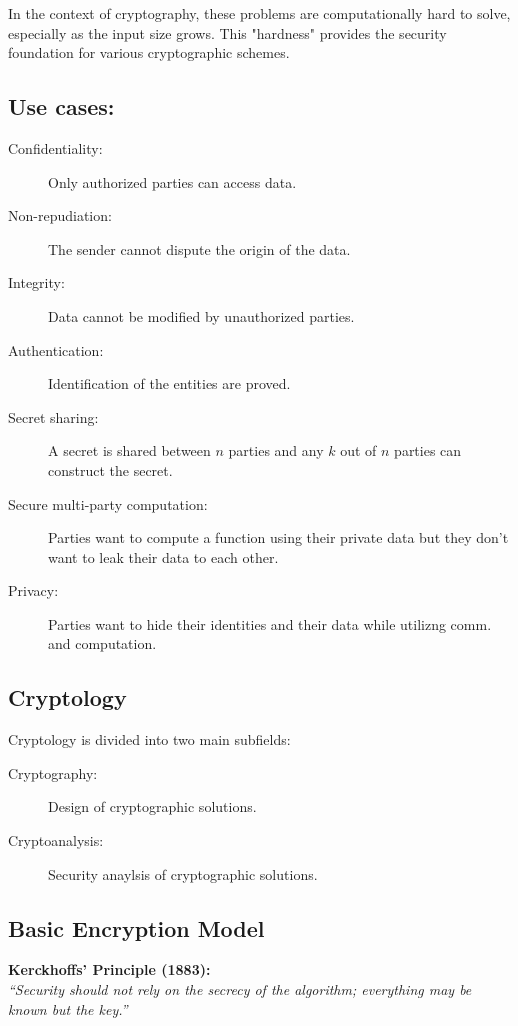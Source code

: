 \documentclass[12pt]{article}
\begin{document}
In the context of cryptography, these problems are computationally hard to solve, especially as the input size grows. This "hardness" provides the security foundation for various cryptographic schemes.

\subsection*{Use cases:}
\begin{description}
    \item[Confidentiality:] Only authorized parties can access data.
    \item[Non-repudiation:] The sender cannot dispute the origin of the data.
    \item[Integrity:] Data cannot be modified by unauthorized parties.
    \item[Authentication:] Identification of the entities are proved.
    \item[Secret sharing:] A secret is shared between \(n\) parties and any \(k\) out of \(n\) parties can construct the secret.
    \item[Secure multi-party computation:] Parties want to compute a function using their private data but they don't want to leak their data to each other.
    \item[Privacy:] Parties want to hide their identities and their data while utilizng comm. and computation. 
\end{description}

\subsection*{Cryptology}
Cryptology is divided into two main subfields:
\begin{description}
    \item[Cryptography:] Design of cryptographic solutions. 
    \item[Cryptoanalysis:] Security anaylsis of cryptographic solutions.
\end{description}

\subsection*{Basic Encryption Model}

\textbf{Kerckhoffs' Principle (1883):} \\
\emph{``Security should not rely on the secrecy of the algorithm; everything may be known but the key.''}
\end{document}
